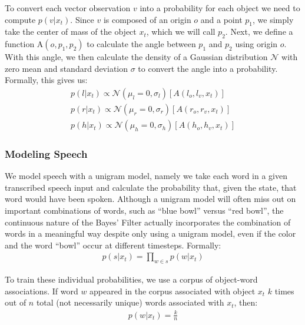 \documentclass[a4paper, 11pt]{article} %
\begin{document}
To convert each vector observation $v$ into a probability for each object we need to compute $p(v | x_t)$. Since $v$ is composed of an origin $o$ and a point $p_1$, we simply take the center of mass of the object $x_t$, which we will call $p_2$. Next, we define a function $\mbox{A}(o, p_1, p_2)$ to calculate the angle between $p_1$ and $p_2$ using origin $o$. With this angle, we then calculate the density of a Gaussian  distribution $\mathcal{N}$ with zero mean and standard deviation $\sigma$ to convert the angle into a probability. Formally, this gives us:
\begin{align}
p(l | x_t) \propto \mathcal{N}(\mu_l=0, \sigma_l)[A(l_o, l_v, x_t)]\\
p(r | x_t) \propto \mathcal{N}(\mu_r=0, \sigma_r)[A(r_o, r_v, x_t)]\\
p(h | x_t) \propto \mathcal{N}(\mu_h=0, \sigma_h)[A(h_o, h_v, x_t)]
\end{align}
\subsubsection{Modeling Speech}
We model speech with a unigram model, namely we take each word in a given transcribed speech input and calculate the probability that, given the state, that word would have been spoken. Although a unigram model will often miss out on important combinations of words, such as ``blue bowl'' versus ``red bowl'', the continuous nature of the Bayes' Filter actually incorporates the combination of words in a meaningful way despite only using a unigram model, even if the color and the word ``bowl'' occur at different timesteps. Formally:
\begin{align}
p(s |x_t) = \displaystyle \prod_{w \in s} p(w | x_t)
\end{align}

To train these individual probabilities, we use a corpus of object-word associations. If word $w$ appeared in the corpus associated with object $x_t$ $k$ times out of $n$ total (not necessarily unique) words associated with $x_t$, then:
\begin{align}
p(w | x_t) = \frac{k}{n}
\end{align}
\end{document}
